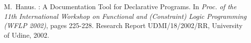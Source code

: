 \documentclass[11pt,fleqn]{article}
\begin{document}
\sloppy



\begin{thebibliography}{10}

M.~Hanus.
: A Documentation Tool for Declarative Programs.
\newblock In {\em Proc. of the 11th International Workshop on Functional
  and (Constraint) Logic Programming (WFLP 2002)}, pages 225-228.
  Research Report UDMI/18/2002/RR, University of Udine, 2002.

\end{thebibliography}
\end{document}
